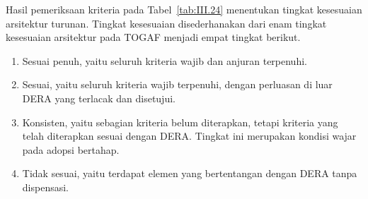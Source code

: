 Hasil pemeriksaan kriteria pada Tabel~\ref{tab:III.24} menentukan tingkat kesesuaian arsitektur turunan. Tingkat kesesuaian disederhanakan dari enam tingkat kesesuaian arsitektur pada TOGAF \cite{TOGAF2022} menjadi empat tingkat berikut.

\begin{enumerate}[label=\arabic*.]
\item Sesuai penuh, yaitu seluruh kriteria wajib dan anjuran terpenuhi.
\item Sesuai, yaitu seluruh kriteria wajib terpenuhi, dengan perluasan di luar DERA yang terlacak dan disetujui.
\item Konsisten, yaitu sebagian kriteria belum diterapkan, tetapi kriteria yang telah diterapkan sesuai dengan DERA. Tingkat ini merupakan kondisi wajar pada adopsi bertahap.
\item Tidak sesuai, yaitu terdapat elemen yang bertentangan dengan DERA tanpa dispensasi.
\end{enumerate}
